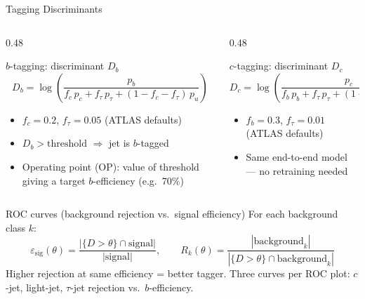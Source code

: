 \documentclass[aspectratio=169, 10pt]{beamer}
\begin{document}
\begin{frame}{Tagging Discriminants}
\begin{columns}[T]
  \begin{column}{0.48\textwidth}
    \begin{block}{$b$-tagging: discriminant $D_b$}
      \[
        D_b = \log\!\left(\frac{p_b}{f_c\,p_c + f_\tau\,p_\tau +
        (1-f_c-f_\tau)\,p_u}\right)
      \]
      \begin{itemize}
        \item $f_c = 0.2$, $f_\tau = 0.05$ (ATLAS defaults)
        \item $D_b > \text{threshold}$ $\Rightarrow$ jet is $b$-tagged
        \item Operating point (OP): value of threshold giving a target
              $b$-efficiency (e.g.\ 70\%)
      \end{itemize}
    \end{block}
  \end{column}
  \begin{column}{0.48\textwidth}
    \begin{block}{$c$-tagging: discriminant $D_c$}
      \[
        D_c = \log\!\left(\frac{p_c}{f_b\,p_b + f_\tau\,p_\tau +
        (1-f_b-f_\tau)\,p_u}\right)
      \]
      \begin{itemize}
        \item $f_b = 0.3$, $f_\tau = 0.01$ (ATLAS defaults)
        \item Same end-to-end model --- no retraining needed
      \end{itemize}
    \end{block}
  \end{column}
\end{columns}
\vspace{6pt}
\begin{block}{ROC curves (background rejection vs.\ signal efficiency)}
  For each background class $k$:
  \[
    \varepsilon_\text{sig}(\theta) = \frac{|\{D > \theta\} \cap \text{signal}|}{|\text{signal}|},
    \qquad
    R_k(\theta) = \frac{|\text{background}_k|}{|\{D > \theta\} \cap \text{background}_k|}
  \]
  Higher rejection at same efficiency = better tagger.
  Three curves per ROC plot: $c$-jet, light-jet, $\tau$-jet rejection vs.\ $b$-efficiency.
\end{block}
\end{frame}
\end{document}
